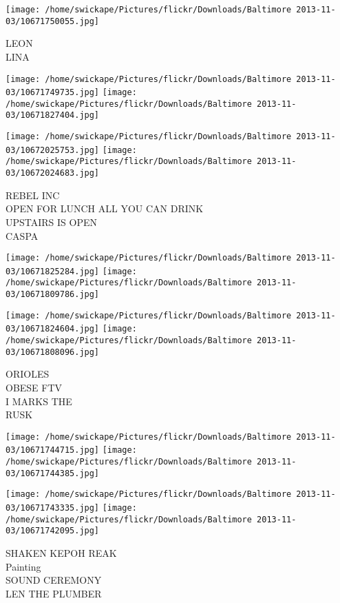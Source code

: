 \documentclass[10pt,letterpaper]{article}
\begin{document}
\vspace{0.25in}
\texttt{[image: /home/swickape/Pictures/flickr/Downloads/Baltimore 2013-11-03/10671750055.jpg]}

LEON\\
LINA\\
\pagebreak

\texttt{[image: /home/swickape/Pictures/flickr/Downloads/Baltimore 2013-11-03/10671749735.jpg]}
\texttt{[image: /home/swickape/Pictures/flickr/Downloads/Baltimore 2013-11-03/10671827404.jpg]}

\texttt{[image: /home/swickape/Pictures/flickr/Downloads/Baltimore 2013-11-03/10672025753.jpg]}
\texttt{[image: /home/swickape/Pictures/flickr/Downloads/Baltimore 2013-11-03/10672024683.jpg]}

REBEL INC\\
OPEN FOR LUNCH ALL YOU CAN DRINK\\
UPSTAIRS IS OPEN\\
CASPA\\
\pagebreak

\texttt{[image: /home/swickape/Pictures/flickr/Downloads/Baltimore 2013-11-03/10671825284.jpg]}
\texttt{[image: /home/swickape/Pictures/flickr/Downloads/Baltimore 2013-11-03/10671809786.jpg]}

\texttt{[image: /home/swickape/Pictures/flickr/Downloads/Baltimore 2013-11-03/10671824604.jpg]}
\texttt{[image: /home/swickape/Pictures/flickr/Downloads/Baltimore 2013-11-03/10671808096.jpg]}

ORIOLES\\
OBESE FTV\\
I MARKS THE\\
RUSK\\
\pagebreak

\texttt{[image: /home/swickape/Pictures/flickr/Downloads/Baltimore 2013-11-03/10671744715.jpg]}
\texttt{[image: /home/swickape/Pictures/flickr/Downloads/Baltimore 2013-11-03/10671744385.jpg]}

\texttt{[image: /home/swickape/Pictures/flickr/Downloads/Baltimore 2013-11-03/10671743335.jpg]}
\texttt{[image: /home/swickape/Pictures/flickr/Downloads/Baltimore 2013-11-03/10671742095.jpg]}

SHAKEN KEPOH REAK\\
Painting\\
SOUND CEREMONY\\
LEN THE PLUMBER\\
\pagebreak
\end{document}
